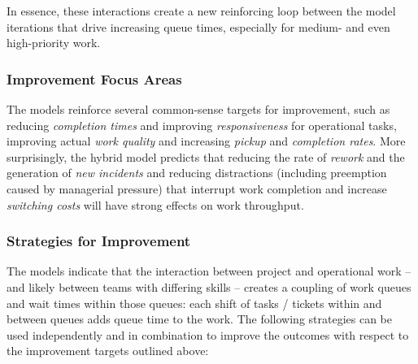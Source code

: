 \documentclass[conference]{IEEEtran}
\begin{document}
In essence, these interactions create a new reinforcing loop between the model iterations that drive increasing queue times, especially for medium- and even high-priority work.

\subsubsection{Improvement Focus Areas}
\label{sec:improvetgts}

The models reinforce several common-sense targets for improvement, such as reducing \textit{completion times} and improving \textit{responsiveness} for operational tasks, improving actual \textit{work quality} and increasing \textit{pickup} and \textit{completion rates}. More surprisingly, the hybrid model predicts that reducing the rate of \textit{rework} and the generation of \textit{new incidents} and reducing distractions (including preemption caused by managerial pressure) that interrupt work completion and increase \textit{switching costs} will have strong effects on work throughput.

\subsubsection{Strategies for Improvement}
\label{sec:improvstrat}

The models indicate that the interaction between project and operational work -- and likely between teams with differing skills -- creates a coupling of work queues and wait times within those queues: each shift of tasks / tickets within and between queues adds queue time to the work. The following strategies can be used independently and in combination to improve the outcomes with respect to the improvement targets outlined above:
\end{document}
